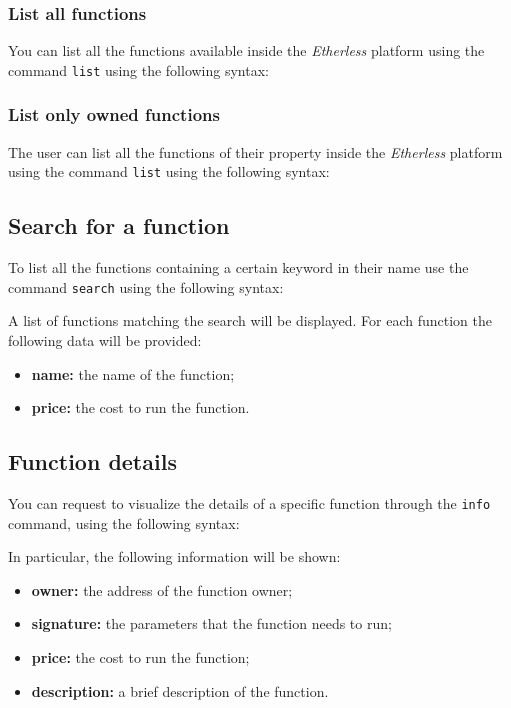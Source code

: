 \subsubsection{List all functions}
You can list all the functions available inside the \textit{Etherless} platform using the command \texttt{list} using the following syntax:
\begin{center}
\end{center}
\subsubsection{List only owned functions}
The user can list all the functions of their property inside the \textit{Etherless} platform using the command \texttt{list} using the following syntax:
\begin{center}
\end{center}

\subsection{Search for a function}
To list all the functions containing a certain keyword in their name use the command \texttt{search} using the following syntax:
\begin{center}
\end{center}

A list of functions matching the search will be displayed. For each function the following data will be provided:
\begin{itemize}
	\item \textbf{name: } the name of the function;
	\item \textbf{price: } the cost to run the function.
\end{itemize}

\subsection{Function details}
You can request to visualize the details of a specific function through the \texttt{info} command, using the following syntax: \\
\begin{center}
\end{center}
In particular, the following information will be shown:
\begin{itemize}
	\item \textbf{owner: } the address of the function owner;
	\item \textbf{signature: } the parameters that the function needs to run;
	\item \textbf{price: } the cost to run the function;
	\item \textbf{description: } a brief description of the function.
\end{itemize}

